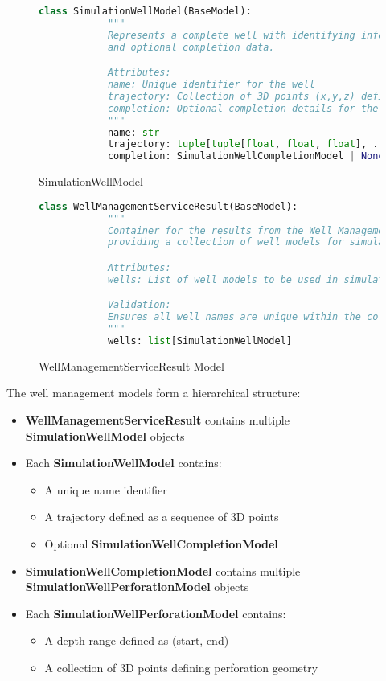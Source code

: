 \begin{enumerate}
	\begin{figure}[H]
		\begin{lstlisting}[language=Python]
			class SimulationWellModel(BaseModel):
			"""
			Represents a complete well with identifying information, trajectory,
			and optional completion data.

			Attributes:
			name: Unique identifier for the well
			trajectory: Collection of 3D points (x,y,z) defining the well path
			completion: Optional completion details for the well
			"""
			name: str
			trajectory: tuple[tuple[float, float, float], ...]
			completion: SimulationWellCompletionModel | None = Field(default=None)
		\end{lstlisting}
		\caption{SimulationWellModel}
	\end{figure}

	\begin{figure}[H]
		\begin{lstlisting}[language=Python]
			class WellManagementServiceResult(BaseModel):
			"""
			Container for the results from the Well Management Service,
			providing a collection of well models for simulation.

			Attributes:
			wells: List of well models to be used in simulation

			Validation:
			Ensures all well names are unique within the collection
			"""
			wells: list[SimulationWellModel]
		\end{lstlisting}
		\caption{WellManagementServiceResult Model}
	\end{figure}

	The well management models form a hierarchical structure:

	\begin{itemize}
		\item \textbf{WellManagementServiceResult} contains multiple \textbf{SimulationWellModel} objects
		\item Each \textbf{SimulationWellModel} contains:
		\begin{itemize}
			\item A unique name identifier
			\item A trajectory defined as a sequence of 3D points
			\item Optional \textbf{SimulationWellCompletionModel}
		\end{itemize}
		\item \textbf{SimulationWellCompletionModel} contains multiple \textbf{SimulationWellPerforationModel} objects
		\item Each \textbf{SimulationWellPerforationModel} contains:
		\begin{itemize}
			\item A depth range defined as (start, end)
			\item A collection of 3D points defining perforation geometry
		\end{itemize}
	\end{itemize}
\end{enumerate}

